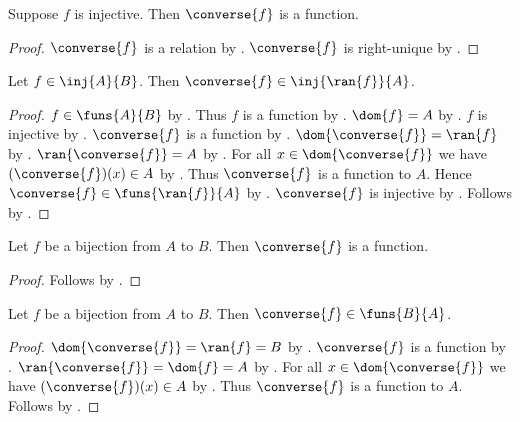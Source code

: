 \begin{proposition}\label{injective_converse_is_function}
    Suppose $f$ is injective. %
    Then $\converse{f}$ is a function.
\end{proposition}
\begin{proof}
    $\converse{f}$ is a relation by .
    $\converse{f}$ is right-unique
        by .
\end{proof}

\begin{proposition}\label{converse_inj_ran_dom}
    Let $f\in\inj{A}{B}$.
    Then $\converse{f}\in\inj{\ran{f}}{A}$.
\end{proposition}
\begin{proof}
    $f\in\funs{A}{B}$ by .
    Thus $f$ is a function by .
    $\dom{f}=A$ by .
    $f$ is injective by .
    $\converse{f}$ is a function
        by .
    $\dom{\converse{f}}=\ran{f}$ by .
    $\ran{\converse{f}}=A$ by .
    For all $x\in\dom{\converse{f}}$ we have
        $(\converse{f})(x)\in A$ by .
    Thus $\converse{f}$ is a function to $A$.
    Hence $\converse{f}\in\funs{\ran{f}}{A}$ by .
    $\converse{f}$ is injective
        by .
    Follows by .
\end{proof}

\begin{proposition}\label{bijective_converse_is_function}
    Let $f$ be a bijection from $A$ to $B$.
    Then $\converse{f}$ is a function.
\end{proposition}
\begin{proof}
    Follows by .
\end{proof}

\begin{proposition}\label{bijective_converse_are_funs}
    Let $f$ be a bijection from $A$ to $B$.
    Then $\converse{f}\in\funs{B}{A}$.
\end{proposition}
\begin{proof}
    $\dom{\converse{f}} = \ran{f} = B$ by .
    $\converse{f}$ is a function by .
    $\ran{\converse{f}}=\dom{f}=A$
        by .
    For all $x\in\dom{\converse{f}}$ we have $(\converse{f})(x)\in A$
        by .
    Thus $\converse{f}$ is a function to $A$.
    Follows by .
\end{proof}

